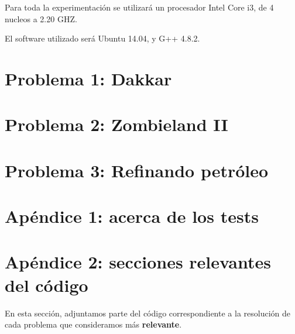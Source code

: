 \documentclass[a4paper]{article}
\begin{document}
Para toda la experimentación se utilizará un procesador Intel Core i3, de 4 nucleos a 2.20 GHZ.

El software utilizado será Ubuntu 14.04, y G++ 4.8.2.
\newpage
\section{Problema 1: Dakkar}


\newpage
\section{Problema 2: Zombieland II}


\newpage
\section{Problema 3: Refinando petróleo}



\newpage
\section{Apéndice 1: acerca de los tests}


\newpage
\section{Apéndice 2: secciones relevantes del código}
En esta sección, adjuntamos parte del código correspondiente a la resolución de cada problema que consideramos más \textbf{relevante}.
\end{document}
